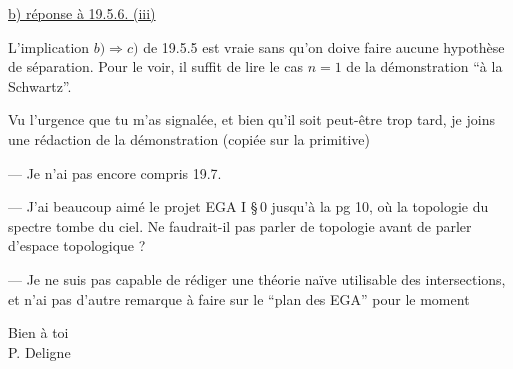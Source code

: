 
\uline{b) réponse à 19.5.6. (iii)}

L'implication $b)\Rightarrow c)$ de 19.5.5 est vraie sans qu'on doive faire aucune hypothèse de séparation. Pour le voir, il suffit de lire le cas $n=1$ de la démonstration ``à la Schwartz''.

Vu l'urgence que tu m'as signalée, et bien qu'il soit peut-être trop tard, je joins une rédaction de la démonstration (copiée sur la primitive)

--- Je n'ai pas encore compris 19.7.

--- J'ai beaucoup aimé le projet EGA I \S\,0 jusqu'à la pg 10, où la topologie du spectre tombe du ciel. Ne faudrait-il pas parler de topologie avant de parler d'espace topologique ?

--- Je ne suis pas capable de rédiger une théorie naïve utilisable des intersections, et n'ai pas d'autre remarque à faire sur le ``plan des EGA'' pour le moment

Bien à toi\\

P. Deligne\\
